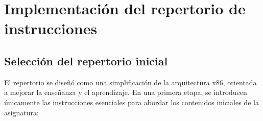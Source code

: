 \documentclass[12pt,oneside]{templates/unerthesis}
\begin{document}
\hypertarget{implementaciuxf3n-del-repertorio-de-instrucciones}{%
\section{Implementación del repertorio de instrucciones}\label{implementaciuxf3n-del-repertorio-de-instrucciones}}

\hypertarget{selecciuxf3n-del-repertorio-inicial}{%
\subsection{Selección del repertorio inicial}\label{selecciuxf3n-del-repertorio-inicial}}

El repertorio se diseñó como una simplificación de la arquitectura x86, orientada a mejorar la enseñanza y el aprendizaje. En una primera etapa, se introducen únicamente las instrucciones esenciales para abordar los contenidos iniciales de la asignatura:

\begin{table}[!h]
\centering
\caption{\label{tab:setreducido}Tabla de instrucciones y códigos de operación}
\centering
{}
\end{table}
\end{document}
